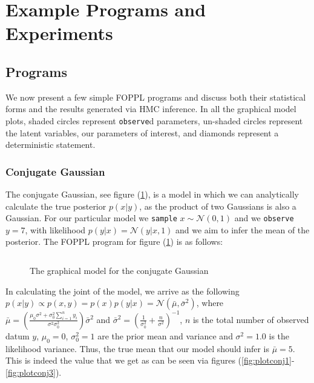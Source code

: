 \section{Example Programs and Experiments}
\label{sec:exampprog}
\subsection{Programs}

We now present a few simple FOPPL programs and discuss both their statistical forms and the results generated via HMC inference. In all the graphical model plots, shaded circles represent \texttt{observe}d parameters, un-shaded circles represent the latent variables, our parameters of interest, and diamonds represent a deterministic statement. 
\subsubsection{Conjugate Gaussian}
The conjugate Gaussian, see figure (\ref{fig:conga}), is a model in which we can analytically calculate the true posterior $p(x | y)$, as the product of two Gaussians is also a Gaussian. For our particular model we \texttt{sample} $x \sim \mathcal{N}(0, 1)$ and we \texttt{observe} $y = 7$, with likelihood $p(y|x) = \mathcal{N}(y | x, 1)$ and we aim to infer the mean of the posterior. The  FOPPL program for figure (\ref{fig:conga}) is as follows:
\inputminted{clojure}{code/conjugategauss.clj}
\begin{figure}[ht]
	\begin{center}
		
	\end{center}
	\caption{The graphical model for the conjugate Gaussian}
	\label{fig:conga}
\end{figure}
In calculating the joint of the model, we arrive as the following $ p(x|y) \propto p(x,y) = p(x)p(y| x) = \mathcal{N}(\bar{\mu}, \bar{\sigma}^{2})$, where $\bar{\mu} = \left(\frac{\mu_{0}\sigma^{2} + \sigma^{2}_{0}\sum_{i=1}^{n}y_{i}}{\sigma^{2}\sigma^{2}_{0}}\right) \bar{\sigma}^{2}$ and $\bar{\sigma}^{2} = \left(\frac{1}{\sigma^{2}_{0}} + \frac{n}{\sigma^{2}}\right)^{-1} $,  $n$ is the total number of observed datum $y$, $\mu_{0} = 0 $, $\sigma_{0}^{2} = 1$ are the prior mean and variance and $\sigma^{2} = 1.0 $ is the likelihood variance. Thus, the true mean that our model should infer is $\bar{\mu} = 5$. This is indeed the value that we get as can be seen via figures (\ref{fig:plotconj1}-\ref{fig:plotconj3}).
